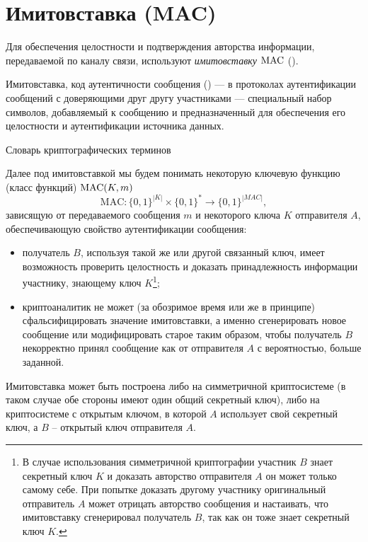\section{Имитовставка (MAC)}\label{section-MAC}

Для обеспечения целостности и подтверждения авторства информации, передаваемой по каналу связи, используют \emph{имитовставку} $\textrm{MAC}$ ().

\begin{displayquote}
Имитовставка, код аутентичности сообщения () —  в  протоколах аутентификации сообщений с доверяющими друг другу участниками — специальный набор символов, добавляемый к сообщению и предназначенный для обеспечения его целостности и аутентификации источника данных.
\begin{flushright}Словарь криптографических терминов~\cite{Pogorelov:Sachkov:2006}
\end{flushright}
\end{displayquote}

Далее под имитовставкой мы будем понимать некоторую ключевую функцию (класс функций) $\textrm{MAC}(K,m)$\[
    \textrm{MAC}: \{0,1\}^{|K|} \times \{0,1\}^* \to \{0,1\}^{|MAC|},
\] зависящую от передаваемого сообщения $m$ и некоторого ключа $K$ отправителя $A$, обеспечивающую свойство аутентификации сообщения:
\begin{itemize}
    \item получатель $B$, используя такой же или другой связанный ключ, имеет возможность проверить целостность и доказать принадлежность информации участнику, знающему ключ $K$\footnote{В случае использования симметричной криптографии участник $B$ знает секретный ключ $K$ и доказать авторство отправителя $A$ он может только самому себе. При попытке доказать другому участнику оригинальный отправитель $A$ может отрицать авторство сообщения и настаивать, что имитовставку сгенерировал получатель $B$, так как он тоже знает секретный ключ $K$.};
    \item криптоаналитик не может (за обозримое время или же в принципе) сфальсифицировать значение имитовставки, а именно сгенерировать новое сообщение или модифицировать старое таким образом, чтобы получатель $B$ некорректно принял сообщение как от отправителя $A$ с вероятностью, больше заданной.
\end{itemize}

Имитовставка может быть построена либо на симметричной криптосистеме (в таком случае обе стороны имеют один общий секретный ключ), либо на криптосистеме с открытым ключом, в которой $A$ использует свой секретный ключ, а $B$ -- открытый ключ отправителя $A$.











